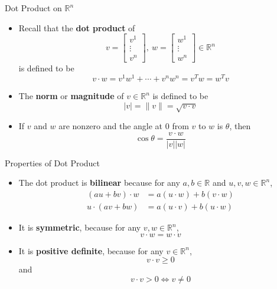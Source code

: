 \documentclass[usenames,dvipsnames,10pt]{beamer}
\newcommand{\R}{\mathbb{R}}
\begin{document}
\begin{frame}
  {Dot Product on $\R^n$}

  \begin{itemize}
  \item Recall that the {\bf dot product} of
    \[
      v = \begin{bmatrix} v^1\\ \vdots \\ v^n \end{bmatrix},\ w = \begin{bmatrix} w^1\\ \vdots \\ w^n \end{bmatrix} \in \R^n
    \]
    is defined to be
    \[
      v\cdot w = v^1w^1+\cdots+v^nw^n = v^Tw = w^Tv
    \]
  \item The {\bf norm} or {\bf magnitude} of $v \in \R^n$ is defined to be
    \[
      |v| = \|v\| = \sqrt{v\cdot v}
    \]
  \item If $v$ and $w$ are nonzero and the angle at $0$ from $v$ to $w$ is $\theta$, then
    \[
      \cos\theta = \frac{v\cdot w}{|v||w|}
    \]
  \end{itemize}
\end{frame}

\begin{frame}
  {Properties of Dot Product}

  \begin{itemize}
  \item The dot product is {\bf bilinear} because for any $a,b \in \R$ and $u,v,w \in \R^n$,
    \begin{align*}
      (au+bv)\cdot w &= a(u\cdot w) + b(v\cdot w)\\
      u\cdot(av+bw) &= a(u\cdot v)+b(u\cdot w)
    \end{align*}
  \item It is {\bf symmetric}, because for any $v, w \in \R^n$,
    \[ v\cdot w = w\cdot v \]
  \item It is {\bf positive definite}, because for any $v \in \R^n$,
    \[
      v\cdot v \ge 0
    \]
    and 
    \[
      v\cdot v > 0 \iff v \ne 0
    \]
  \end{itemize}
\end{frame}
\end{document}

